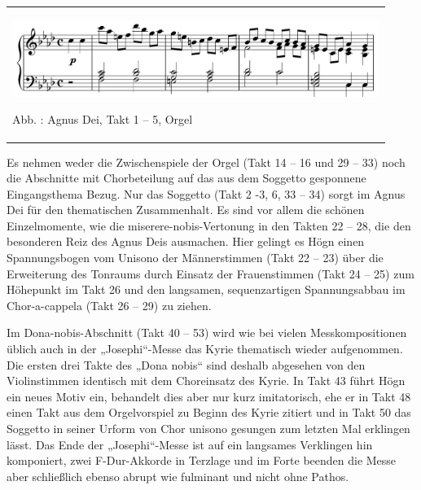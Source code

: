 \documentclass[a4paper]{article}
\newcounter{Abb}
\renewcommand\theAbb{\arabic{Abb}}
\begin{document}
\begin{center}
\tablefirsthead{}
\tablehead{}
\tabletail{}
\tablelasttail{}
\begin{supertabular}{m{12.107cm}}

\includegraphics[width=11.924cm,height=2.489cm]{pictures/zulassungsarbeit-img123.png}

Abb. \stepcounter{Abb}{\theAbb}: Agnus Dei, Takt 1 – 5, Orgel\\
\end{supertabular}
\end{center}
Es nehmen weder die Zwischenspiele der Orgel (Takt 14 – 16 und 29 – 33)
noch die Abschnitte mit Chorbeteilung auf das aus dem Soggetto
gesponnene Eingangsthema Bezug. Nur das Soggetto (Takt 2 -3, 6, 33 –
34) sorgt im Agnus Dei für den thematischen Zusammenhalt. Es sind vor
allem die schönen Einzelmomente, wie die miserere-nobis-Vertonung in
den Takten 22 – 28, die den besonderen Reiz des Agnus Deis ausmachen.
Hier gelingt es Högn einen Spannungsbogen vom Unisono der Männerstimmen
(Takt 22 – 23) über die Erweiterung des Tonraums durch Einsatz der
Frauenstimmen (Takt 24 – 25) zum Höhepunkt im Takt 26 und den
langsamen, sequenzartigen Spannungsabbau im Chor-a-cappela (Takt 26 –
29) zu ziehen.

Im Dona-nobis-Abschnitt (Takt 40 – 53) wird wie bei vielen
Messkompositionen üblich auch in der „Josephi“-Messe das Kyrie
thematisch wieder aufgenommen. Die ersten drei Takte des „Dona nobis“
sind deshalb abgesehen von den Violinstimmen identisch mit dem
Choreinsatz des Kyrie. In Takt 43 führt Högn ein neues Motiv ein,
behandelt dies aber nur kurz imitatorisch, ehe er in Takt 48 einen Takt
aus dem Orgelvorspiel zu Beginn des Kyrie zitiert und in Takt 50 das
Soggetto in seiner Urform von Chor unisono gesungen zum letzten Mal
erklingen lässt. Das Ende der „Josephi“-Messe ist auf ein langsames
Verklingen hin komponiert, zwei F-Dur-Akkorde in Terzlage und im Forte
beenden die Messe aber schließlich ebenso abrupt wie fulminant und
nicht ohne Pathos.
\end{document}

